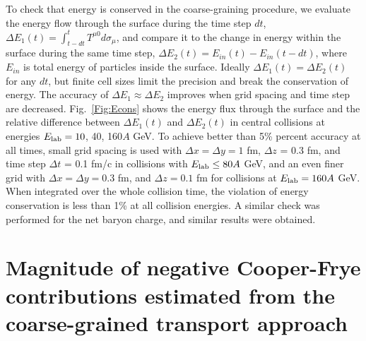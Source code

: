 To check that energy is conserved in the coarse-graining procedure, we
evaluate the energy flow through the surface during the time step
$dt$, $\Delta E_1(t) = \int_{t-dt}^{t} T^{\mu 0} d\sigma_{\mu}$, and
compare it to the change in energy within the surface during the same
time step, $\Delta E_2(t) = E_{in}(t) - E_{in}(t-dt)$, where $E_{in}$
is total energy of particles inside the surface. Ideally
$\Delta E_1(t) = \Delta E_2(t)$ for any $dt$, but finite cell sizes
limit the precision and break the conservation of energy. The accuracy
of $\Delta E_1 \approx \Delta E_2$ improves when grid spacing and time
step are decreased. Fig.~\ref{Fig:Econs} shows the energy flux
through the surface and the relative difference between
$\Delta E_1(t)$ and $\Delta E_2(t)$ in central collisions at energies
$E_\mathrm{lab} = 10$, 40, 160$A$ GeV. To achieve better than 5\% percent
accuracy at all times, small grid spacing is used with
$\Delta x = \Delta y = 1$ fm, $\Delta z$ = 0.3 fm, and time step
$\Delta t$ = 0.1 fm/c in collisions with $E_\mathrm{lab} \le 80A$ GeV,
and an even finer grid with $\Delta x = \Delta y = 0.3$ fm, and
$\Delta z = 0.1$ fm for collisions at $E_\mathrm{lab} = 160A$ GeV. When
integrated over the whole collision time, the violation of energy
conservation is less than 1\% at all collision energies. A similar check was performed
for the net baryon charge, and similar results were obtained.


\section{Magnitude of negative Cooper-Frye contributions estimated from the coarse-grained transport approach}
\label{sec:cf_Results}

